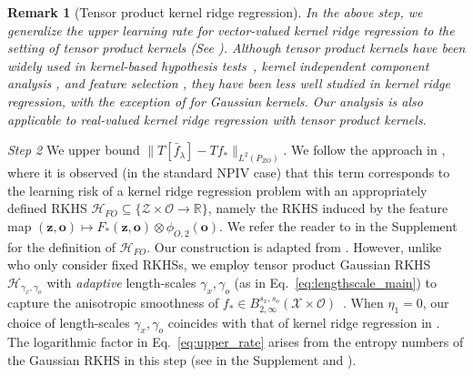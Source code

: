 \documentclass[11pt]{article}
\newcommand{\bz}{\mathbf z}
\newcommand{\bo}{\mathbf o}
\newcommand{\calZ}{\mathcal{Z}}
\newcommand{\calH}{\mathcal{H}}
\newcommand{\calO}{\mathcal{O}}
\newcommand{\calX}{\mathcal{X}}
\newcommand{\0}{\mathbf{0}}
\newtheorem{rem}{Remark}[section]
\begin{document}
\begin{rem}[Tensor product kernel ridge regression]
\label{rem:tensor_krr}
    In the above step, we generalize the upper learning rate for vector-valued kernel ridge regression to the setting of tensor product kernels (See ). Although tensor product kernels have been widely used in kernel-based hypothesis tests~\citep{gretton2007kernel,GreGyo10,SejGreBer13,gretton2015characteristic,ZhaFilGreSej18,AlbLaurMarMey22,szabo2018characteristic},  kernel independent component analysis \citep{BacJor02,SheJegGre09},  and feature selection \citep{SonSmoGreBedetal12,LiPogSutGre21}, they have  been less well studied  in kernel ridge regression, with the exception of \citet{hang2021optimal} for Gaussian kernels. Our analysis is also applicable to real-valued kernel ridge regression with tensor product kernels.
\end{rem}
\textit{Step 2} We upper bound $\|T[\bar{f}_\lambda]-T f_*\|_{L^2(P_{Z O})}$. We follow the approach in \citet{blanchard2018optimal, meunier2024nonparametricinstrumentalregressionkernel}, where it is observed (in the standard NPIV case) that this term corresponds to the learning risk of a kernel ridge regression problem with an appropriately defined RKHS $\calH_{FO} \subseteq \{\calZ\times \calO\to \mathbb{R}\}$, namely the RKHS induced by the feature map $(\bz,\bo)\mapsto F_{\ast}(\bz,\bo)\otimes \phi_{O,2}(\bo)$. We refer the reader to  in the Supplement for the definition of $\calH_{FO}$. Our construction is adapted from \citet[Appendix E.1.2]{meunier2024nonparametricinstrumentalregressionkernel}. However, unlike \citet{blanchard2018optimal, meunier2024nonparametricinstrumentalregressionkernel} who only consider fixed RKHSs, we employ tensor product Gaussian RKHS $\calH_{\gamma_x, \gamma_o}$ with \emph{adaptive} length-scales $\gamma_x, \gamma_o$ (as in Eq.~\eqref{eq:lengthscale_main}) to capture the anisotropic smoothness of $f_\ast \in B^{s_x, s_o}_{2,\infty}(\calX\times \calO)$~\citep{hang2021optimal}. 
When $\eta_1 = 0$, our choice of length-scales $\gamma_x, \gamma_o$ coincides with that of kernel ridge regression in \citet{hang2021optimal}. 
The logarithmic factor  in Eq.~\eqref{eq:upper_rate} arises from the entropy numbers of the Gaussian RKHS in this step (see  in the Supplement and \citet[Proposition 1]{hang2021optimal}). 
\end{document}

